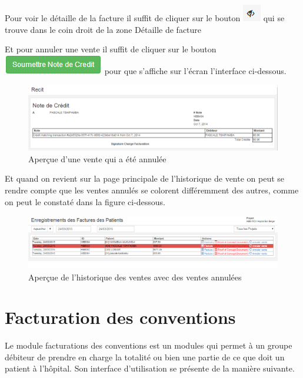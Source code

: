 \documentclass[12pt,a4paper]{report}
\begin{document}
Pour voir le détaille de la facture il suffit de cliquer sur le bouton \includegraphics[scale=0.7]{pic/SeeInvoice.png} qui se trouve dans le coin droit de la zone Détaille de facture   


Et pour annuler une vente il suffit de cliquer sur le bouton \includegraphics[scale=0.7]{pic/SubmitNoteCredit.png}  pour que s'affiche sur l'écran l'interface ci-dessous.

\begin{figure}[h]
\begin{center}
\includegraphics[width=14cm]{pic/RecetteCredit.png}
\end{center}
\caption{Aperçue d'une vente qui a été annulée}
\label{Aperçue d'une vente qui a été annulée}
\end{figure}

Et quand on revient sur la page principale de l'historique de vente on peut se rendre compte que les ventes annulés se colorent différemment des autres, comme on peut le constaté dans la figure ci-dessous.

\begin{figure}[h]
\begin{center}
\includegraphics[width=14cm]{pic/HistoriqueVenteDell.png}
\end{center}
\caption{Aperçue de l'historique des ventes avec des ventes annulées}
\label{Aperçue de l'historique des ventes avec des ventes annulées}
\end{figure}


\newpage
\section{Facturation des conventions}
Le module facturations des conventions est un modules qui permet à un groupe débiteur de prendre en charge la totalité ou bien une partie de ce que doit un patient à l'hôpital. Son interface d'utilisation se présente de la manière suivante.
\end{document}

